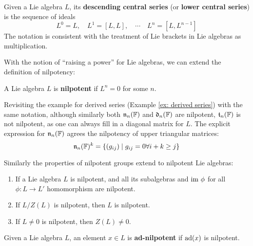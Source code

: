 \documentclass{article}
\begin{document}
\begin{definition}
    Given a Lie algebra $L$, its \textbf{descending central series} (or \textbf{lower central series}) is the sequence of ideals
    \[
        L^{0} = L, \quad L^{1} = [L, L], \quad \cdots \quad L^{n} = [L, L^{n-1}]
    \]
    The notation is consistent with the treatment of Lie brackets in Lie algebras as multiplication.
\end{definition}
\nogap
{}

\textstart
With the notion of ``raising a power'' for Lie algebras, we can extend the definition of nilpotency:

\begin{definition}
    A Lie algebra $L$ is \textbf{nilpotent} if $L^{n} = 0$ for some $n$.
\end{definition}
\nogap
\begin{example}
    Revisiting the example for derived series (Example \ref{ex: derived series}) with the same notation, although similarly both $\mathfrak{n}_n(\mathbb{F})$ and $\mathfrak{d}_n(\mathbb{F})$ are nilpotent, $\mathfrak{t}_n(\mathbb{F})$ is not nilpotent, as one can always fill in a diagonal matrix for $L$. The explicit expression for $\mathfrak{n}_n(\mathbb{F})$ agrees the nilpotency of upper triangular matrices:
    \[
        \mathfrak{n}_n(\mathbb{F})^k = \{ (g_{ij}) \mid g_{ij} = 0 \forall i + k \geq j \}
    \]
\end{example}

\begin{remark}
    Similarly the properties of nilpotent groups extend to nilpotent Lie algebras:
    \begin{enumerate}
        \item If a Lie algebra $L$ is nilpotent, and all its subalgebras and $\mathrm{im}\  \phi$ for all $\phi: L \to L'$ homomorphism are nilpotent. 
        \item If $L/Z(L)$ is nilpotent, then $L$ is nilpotent.
        \item If $L \neq 0$ is nilpotent, then $Z(L) \neq 0$.
    \end{enumerate}
\end{remark}

\begin{definition}[Ad-nilpotent]
    Given a Lie algebra $L$, an element $x \in L$ is \textbf{ad-nilpotent} if $\operatorname{ad}(x)$ is nilpotent.
\end{definition}
\end{document}
